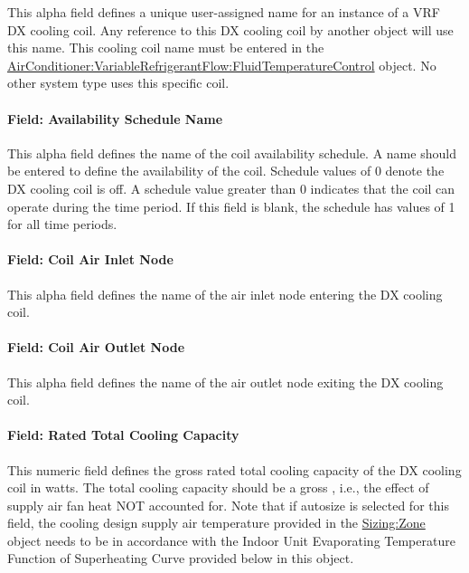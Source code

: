 This alpha field defines a unique user-assigned name for an instance of a VRF DX cooling coil. Any reference to this DX cooling coil by another object will use this name. This cooling coil name must be entered in the \hyperref[airconditionervariablerefrigerantflowfluidtemperaturecontrol]{AirConditioner:VariableRefrigerantFlow:FluidTemperatureControl} object. No other system type uses this specific coil.

\paragraph{Field: Availability Schedule Name}\label{field-availability-schedule-name-3-003}

This alpha field defines the name of the coil availability schedule. A name should be entered to define the availability of the coil. Schedule values of 0 denote the DX cooling coil is off. A schedule value greater than 0 indicates that the coil can operate during the time period. If this field is blank, the schedule has values of 1 for all time periods.

\paragraph{Field: Coil Air Inlet Node}\label{field-coil-air-inlet-node-1}

This alpha field defines the name of the air inlet node entering the DX cooling coil.

\paragraph{Field: Coil Air Outlet Node}\label{field-coil-air-outlet-node-1}

This alpha field defines the name of the air outlet node exiting the DX cooling coil.

\paragraph{Field: Rated Total Cooling Capacity}\label{field-rated-total-cooling-capacity}

This numeric field defines the gross rated total cooling capacity of the DX cooling coil in watts. The total cooling capacity should be a gross , i.e., the effect of supply air fan heat NOT accounted for. Note that if autosize is selected for this field, the cooling design supply air temperature provided in the \hyperref[sizingzone]{Sizing:Zone} object needs to be in accordance with the Indoor Unit Evaporating Temperature Function of Superheating Curve provided below in this object.

